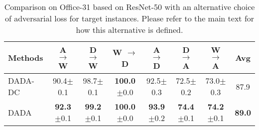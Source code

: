 \documentclass[letterpaper]{article} \usepackage{aaai20}  \usepackage{times}  \usepackage{helvet} \usepackage{courier}  \usepackage[hyphens]{url}  \usepackage{graphicx} \urlstyle{rm} \def\UrlFont{\rm}  \usepackage{graphicx}  \frenchspacing  \setlength{\pdfpagewidth}{8.5in}  \setlength{\pdfpageheight}{11in}
\begin{document}
\begin{table*}[t]
	\caption{Comparison on Office-31 based on ResNet-50 with an alternative choice of adversarial loss for target instances. Please refer to the main text for how this alternative is defined.}
	\label{table:other_variants_office31}
	\begin{center}
		\begin{tabular}{lccccccc}
			\hline
			Methods     & A $\rightarrow$ W & D $\rightarrow$ W & W $\rightarrow$ D & A $\rightarrow$ D & D $\rightarrow$ A & W $\rightarrow$ A & Avg \\
			\hline
			
			DADA-DC     & 90.4$\pm$0.1 & 98.7$\pm$0.1 & \textbf{100.0}$\pm$0.0 & 92.5$\pm$0.3 & 72.5$\pm$0.2 & 73.0$\pm$0.3 & 87.9 \\
			
			DADA        & \textbf{92.3}$\pm$0.1 & \textbf{99.2}$\pm$0.1 & \textbf{100.0}$\pm$0.0 & \textbf{93.9}$\pm$0.2 & \textbf{74.4}$\pm$0.1 & \textbf{74.2}$\pm$0.1 & \textbf{89.0} \\
			
			\hline
		\end{tabular}
	\end{center}
\end{table*}
\end{document}
